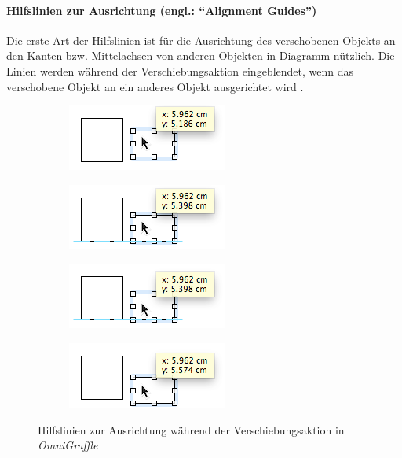 \paragraph{Hilfslinien zur Ausrichtung (engl.: \enquote{Alignment Guides})}

Die erste Art der Hilfslinien ist für die Ausrichtung des verschobenen Objekts an den Kanten bzw. Mittelachsen von anderen Objekten in Diagramm nützlich. Die Linien werden während der Verschiebungsaktion eingeblendet, wenn das verschobene Objekt an ein anderes Objekt ausgerichtet wird \cite{11Keynote}.

\begin{figure}[hbt]
    \newcommand{\subfigurewidth}{0.5\textwidth}
    \begin{subfigure}{\subfigurewidth}
        \centering
        \includegraphics{resources/omnigraffle-smart-guides-a}
        \caption{}
        \label{fig:omnigraffle-smart-guides-a}
    \end{subfigure}
    \begin{subfigure}{\subfigurewidth}
        \centering
        \includegraphics{resources/omnigraffle-smart-guides-b}
        \caption{}
        \label{fig:omnigraffle-smart-guides-b}
    \end{subfigure}
    \begin{subfigure}{\subfigurewidth}
        \centering
        \includegraphics{resources/omnigraffle-smart-guides-c}
        \caption{}
        \label{fig:omnigraffle-smart-guides-c}
    \end{subfigure}
    \begin{subfigure}{\subfigurewidth}
        \centering
        \includegraphics{resources/omnigraffle-smart-guides-d}
        \caption{}
        \label{fig:omnigraffle-smart-guides-d}
    \end{subfigure}
    \caption{Hilfslinien zur Ausrichtung während der Verschiebungsaktion in \textit{OmniGraffle}}
    \label{fig:omnigraffle-smart-guides}
\end{figure}

